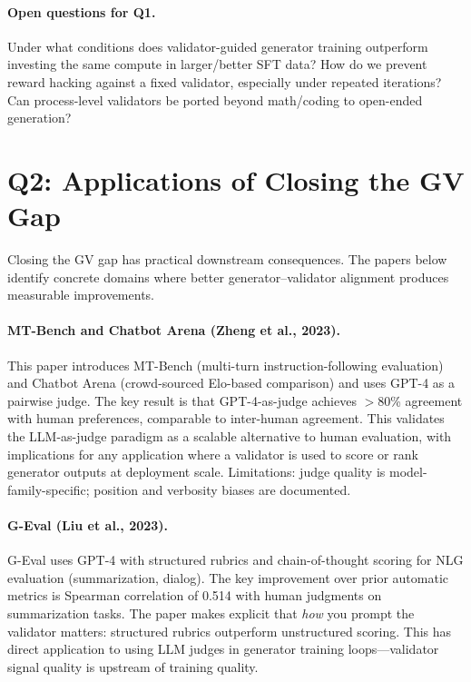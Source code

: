 \documentclass[11pt]{article}
\begin{document}
\paragraph{Open questions for Q1.}
Under what conditions does validator-guided generator training outperform investing the same compute in larger/better SFT data? How do we prevent reward hacking against a fixed validator, especially under repeated iterations? Can process-level validators be ported beyond math/coding to open-ended generation?

\section{Q2: Applications of Closing the GV Gap}

Closing the GV gap has practical downstream consequences. The papers below identify concrete domains where better generator--validator alignment produces measurable improvements.

\paragraph{MT-Bench and Chatbot Arena (Zheng et al., 2023).}
This paper introduces MT-Bench (multi-turn instruction-following evaluation) and Chatbot Arena (crowd-sourced Elo-based comparison) and uses GPT-4 as a pairwise judge. The key result is that GPT-4-as-judge achieves $>$80\% agreement with human preferences, comparable to inter-human agreement. This validates the LLM-as-judge paradigm as a scalable alternative to human evaluation, with implications for any application where a validator is used to score or rank generator outputs at deployment scale. Limitations: judge quality is model-family-specific; position and verbosity biases are documented.

\paragraph{G-Eval (Liu et al., 2023).}
G-Eval uses GPT-4 with structured rubrics and chain-of-thought scoring for NLG evaluation (summarization, dialog). The key improvement over prior automatic metrics is Spearman correlation of 0.514 with human judgments on summarization tasks. The paper makes explicit that \emph{how} you prompt the validator matters: structured rubrics outperform unstructured scoring. This has direct application to using LLM judges in generator training loops---validator signal quality is upstream of training quality.
\end{document}
